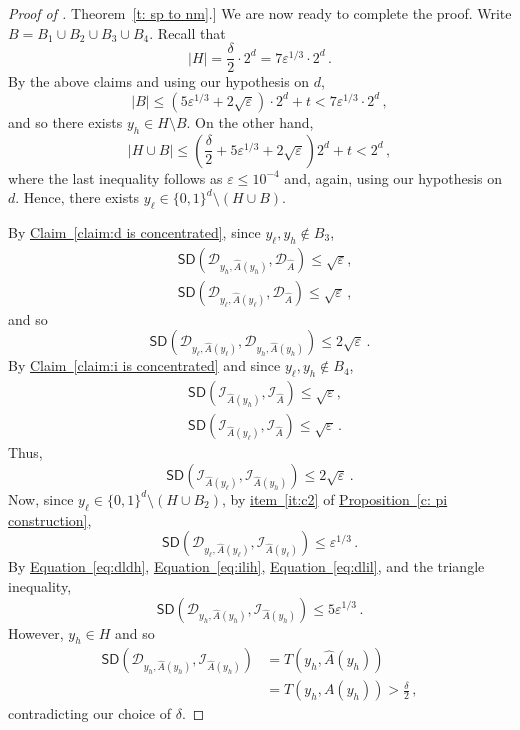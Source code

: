 \documentclass[11pt]{article}
\numberwithin{equation}{section}
\theoremstyle{definition}
\theoremstyle{plain}
\newcommand{\expref}[2]{\hyperref[#2]{#1~\ref{#2}}}
\newcommand{\expeqref}[2]{\hyperref[#2]{#1~\eqref{#2}}}
\newcommand{\adv}{A}
\newcommand{\eps}{\varepsilon}
\newcommand{\abs}[1]{\left\lvert #1\right\rvert}
\def\SD{\ensuremath{\mathsf{SD}}}
\begin{document}
\begin{proof}[Proof of \expref{Theorem}{t: sp to nm}.]
We are now ready to complete the proof. Write $B = B_1 \cup B_2 \cup B_3 \cup B_4$. Recall that \[\abs{H} = \frac{\delta}{2}\cdot 2^d = 7\eps^{1/3} \cdot 2^d\,.\]
By the above claims and using our hypothesis on $d$,
\[
\abs{B} \leq (5\eps^{1/3} + 2\sqrt{\eps})\cdot 2^d + t < 7\eps^{1/3} \cdot 2^d\,,
\]
and so there exists $y_h \in H \setminus B$.  On the other hand, 
\[
\abs{H \cup B} \le \left(\frac{\delta}{2} + 5\eps^{1/3} + 2\sqrt{\eps}  \right) 2^d + t < 2^d\,,
\]
where the last inequality follows as $\eps \leq 10^{-4}$ and, again, using our hypothesis on $d$. Hence, there exists $y_\ell \in \{0,1\}^d \setminus (H \cup B)$. 

By \expref{Claim}{claim:d is concentrated}, since $y_\ell,y_h \notin B_3$,
\begin{align*}
&\SD\left(\mathcal{D}_{y_h,\widehat{A}(y_h)}, \mathcal{D}_{\widehat{A}} \right) \le \sqrt{\eps}, \\
&\SD\left(\mathcal{D}_{y_\ell,\widehat{A}(y_\ell)}, \mathcal{D}_{\widehat{A}} \right) \le \sqrt{\eps}\,,
\end{align*}
and so
\begin{equation}\label{eq:dldh}
\SD\left(\mathcal{D}_{y_\ell,\widehat{A}(y_\ell)}, \mathcal{D}_{y_h,\widehat{A}(y_h)}\right) \le 2\sqrt{\eps}\,.
\end{equation}
By \expref{Claim}{claim:i is concentrated} and since $y_\ell,y_h \notin B_4$,
\begin{align*}
&\SD\left(\mathcal{I}_{\widehat{A}(y_h)}, \mathcal{I}_{\widehat{A}} \right) \le \sqrt{\eps}, \\
&\SD\left(\mathcal{I}_{\widehat{A}(y_\ell)}, \mathcal{I}_{\widehat{A}} \right) \le \sqrt{\eps}\,.
\end{align*}
Thus,
\begin{equation}\label{eq:ilih}
\SD\left(\mathcal{I}_{\widehat{A}(y_\ell)}, \mathcal{I}_{\widehat{A}(y_h)} \right) \le 2\sqrt{\eps}\,.
\end{equation}
Now, since $y_\ell \in \{0,1\}^d \setminus (H \cup B_2)$, by \expeqref{item}{it:c2} of \expref{Proposition}{c: pi construction},
\begin{equation}\label{eq:dlil}
\SD\left(\mathcal{D}_{y_\ell,\widehat{A}(y_\ell)}, \mathcal{I}_{\widehat{A}(y_\ell)}\right) \le \eps^{1/3}\,.
\end{equation}
By \expeqref{Equation}{eq:dldh}, \expeqref{Equation}{eq:ilih}, \expeqref{Equation}{eq:dlil}, and the triangle inequality,
\[
\SD\left(\mathcal{D}_{y_h,\widehat{A}(y_h)}, \mathcal{I}_{\widehat{A}(y_h)}\right) \le 5 \eps^{1/3}\,.
\]
However, $y_h \in H$ and so
\begin{align*}
\SD\left( \mathcal{D}_{y_h,\widehat{A}(y_h)}, \mathcal{I}_{\widehat{A}(y_h)} \right) &= T\left(y_h,\widehat{A}(y_h)\right) \\
&= T(y_h, \adv(y_h)) > \frac{\delta}{2}\,,
\end{align*}
contradicting our choice of $\delta$.
\end{proof}
\end{document}
